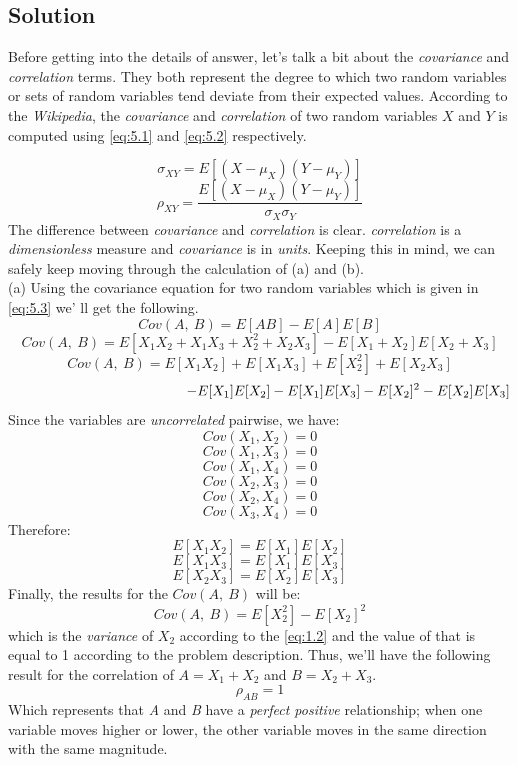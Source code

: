 \documentclass[12pt]{article}
\numberwithin{equation}{section}
\numberwithin{table}{section}
\numberwithin{figure}{section}
\begin{document}
\subsection*{Solution}
Before getting into the details of answer, let's talk a bit about the \textit{covariance} and \textit{correlation} terms. They both represent the degree to which two random variables or sets of random variables tend deviate from their expected values. According to the \textit{Wikipedia}, the \textit{covariance} and \textit{correlation} of two random variables $X$ and $Y$ is computed using \ref{eq:5.1} and \ref{eq:5.2} respectively.

\begin{equation}\label{eq:5.1}
	\sigma_{XY} = E[(X-\mu_X)(Y-\mu_Y)]
\end{equation}
\begin{equation}\label{eq:5.2}
	\rho_{XY} = \frac{E[(X-\mu_X)(Y-\mu_Y)]}{\sigma_X\sigma_Y}
\end{equation}
The difference between \textit{covariance} and \textit{correlation} is clear. \textit{correlation} is a \textit{dimensionless} measure and \textit{covariance} is in \textit{units}. Keeping this in mind, we can safely keep moving through the calculation of (a) and (b).\\
(a) Using the covariance equation for two random variables which is given in \ref{eq:5.3} we'
ll get the following.
\begin{equation}\label{eq:5.3}
Cov(A,\ B) = E[AB] - E[A]E[B]
\end{equation}
$$
	Cov(A,\ B) = E[X_1X_2 + X_1X_3 + X_2^2 + X_2X_3] - E[X_1 + X_2]E[X_2 + X_3]
$$
$$
Cov(A,\ B) = E[X_1X_2] + E[X_1X_3] + E[X_2^2] + E[X_2X_3]
$$
$$
\hspace{4.5cm}- E[X_1]E[X_2] - E[X_1]E[X_3] - E[X_2]^2 - E[X_2]E[X_3]
$$
Since the variables are \textit{uncorrelated} pairwise, we have:
$$
	Cov(X_1, X_2) = 0
$$
$$
Cov(X_1, X_3) = 0
$$
$$
Cov(X_1, X_4) = 0
$$
$$
Cov(X_2, X_3) = 0
$$
$$
Cov(X_2, X_4) = 0
$$
$$
Cov(X_3, X_4) = 0
$$
Therefore:
$$
E[X_1X_2] = E[X_1]E[X_2]
$$
$$
E[X_1X_3] = E[X_1]E[X_3]
$$
$$
E[X_2X_3] = E[X_2]E[X_3]
$$
Finally, the results for the $Cov(A,\ B)$ will be:
$$
	Cov(A,\ B) = E[X_2^2] - E[X_2]^2
$$
which is the \textit{variance} of $X_2$ according to the \ref{eq:1.2} and the value of that is equal to 1 according to the problem description. Thus, we'll have the following result for the correlation of $A=X_1+X_2$ and $B=X_2+X_3$.
$$
\boxed{\rho_{AB} =	1}
$$
Which represents that \textit{A} and \textit{B} have a \textit{perfect positive} relationship; when one variable moves higher or lower, the other variable moves in the same direction with the same magnitude.
\end{document}
